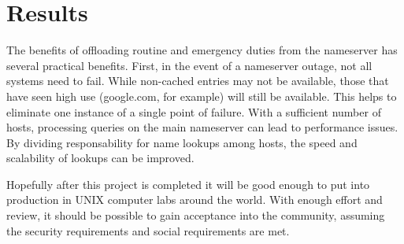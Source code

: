 \documentclass[12pt,letterpaper,titlepage]{article}
\begin{document}
\section{Results}
The benefits of offloading routine and emergency duties from the nameserver has several practical benefits. First, in the event of a nameserver outage, not all systems need to fail. While non-cached entries may not be available, those that have seen high use (google.com, for example) will still be available. This helps to eliminate one instance of a single point of failure. With a sufficient number of hosts, processing queries on the main nameserver can lead to performance issues. By dividing responsability for name lookups among hosts, the speed and scalability of lookups can be improved.

Hopefully after this project is completed it will be good enough to put into production in UNIX computer labs around the world. With enough effort and review, it should be possible to gain acceptance into the community, assuming the security requirements and social requirements are met.
\end{document}
